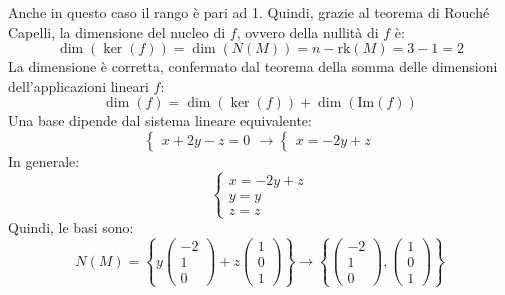 \documentclass[a4paper]{article}
\begin{document}
	Anche in questo caso il rango è pari ad 1. Quindi, grazie al teorema di Rouché Capelli, la dimensione del nucleo di $f$, ovvero della nullità di $f$ è:
	\begin{equation*}
		\dim\left(\ker\left(f\right)\right) = \dim\left(N\left(M\right)\right) = n - \mathrm{rk}\left(M\right) = 3-1 = 2
	\end{equation*}
	La dimensione è corretta, confermato dal teorema della somma delle dimensioni dell'applicazioni lineari $f$:\
	\begin{equation*}
		\dim\left(f\right) = \dim\left(\ker\left(f\right)\right) + \dim\left(\mathrm{Im}\left(f\right)\right)
	\end{equation*}
	Una base dipende dal sistema lineare equivalente:
	\begin{equation*}
		\begin{cases}
			x + 2y -z = 0
		\end{cases}
		\longrightarrow
		\begin{cases}
			x = -2y + z
		\end{cases}
	\end{equation*}
	In generale:
	\begin{equation*}
		\begin{cases}
			x = -2y + z \\
			y = y \\
			z = z
		\end{cases}
	\end{equation*}
	Quindi, le basi sono:
	\begin{equation*}
		N\left(M\right) = \left\{
			y \begin{pmatrix}
				-2 \\
				1 \\
				0
			\end{pmatrix} +
			z \begin{pmatrix}
				1 \\
				0 \\
				1
			\end{pmatrix}
		\right\} \longrightarrow \left\{
			\begin{pmatrix}
				-2 \\
				1 \\
				0
			\end{pmatrix},
			\begin{pmatrix}
				1 \\
				0 \\
				1
			\end{pmatrix}
		\right\}
	\end{equation*}
\end{document}
